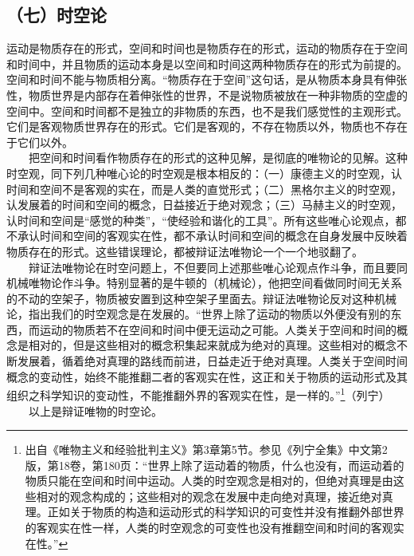 \documentclass[cn,11pt,chinese]{elegantbook}
\def\myformat#1{\hfil\hfil #1}
\begin{document}
\subsection*{\myformat{（七）时空论}}
运动是物质存在的形式，空间和时间也是物质存在的形式，运动的物质存在于空间和时间中，并且物质的运动本身是以空间和时间这两种物质存在的形式为前提的。空间和时间不能与物质相分离。“物质存在于空间”这句话，是从物质本身具有伸张性，物质世界是内部存在着伸张性的世界，不是说物质被放在一种非物质的空虚的空间中。空间和时间都不是独立的非物质的东西，也不是我们感觉性的主观形式。它们是客观物质世界存在的形式。它们是客观的，不存在物质以外，物质也不存在于它们以外。\\
　　把空间和时间看作物质存在的形式的这种见解，是彻底的唯物论的见解。这种时空观，同下列几种唯心论的时空观是根本相反的：（一）康德主义的时空观，认时间和空间不是客观的实在，而是人类的直觉形式；（二）黑格尔主义的时空观，认发展着的时间和空间的概念，日益接近于绝对观念；（三）马赫主义的时空观，认时间和空间是“感觉的种类”，“使经验和谐化的工具”。所有这些唯心论观点，都不承认时间和空间的客观实在性，都不承认时间和空间的概念在自身发展中反映着物质存在的形式。这些错误理论，都被辩证法唯物论一个一个地驳翻了。\\
　　辩证法唯物论在时空问题上，不但要同上述那些唯心论观点作斗争，而且要同机械唯物论作斗争。特别显著的是牛顿的（机械论），他把空间看做同时间无关系的不动的空架子，物质被安置到这种空架子里面去。辩证法唯物论反对这种机械论，指出我们的时空观念是在发展的。“世界上除了运动的物质以外便没有别的东西，而运动的物质若不在空间和时间中便无运动之可能。人类关于空间和时间的概念是相对的，但是这些相对的概念积集起来就成为绝对的真理。这些相对的概念不断发展着，循着绝对真理的路线而前进，日益走近于绝对真理。人类关于空间时间概念的变动性，始终不能推翻二者的客观实在性，这正和关于物质的运动形式及其组织之科学知识的变动性，不能推翻外界的客观实在性，是一样的。”\footnote[15]{ 出自《唯物主义和经验批判主义》第3章第5节。参见《列宁全集》中文第2版，第18卷，第180页：“世界上除了运动着的物质，什么也没有，而运动着的物质只能在空间和时间中运动。人类的时空观念是相对的，但绝对真理是由这些相对的观念构成的；这些相对的观念在发展中走向绝对真理，接近绝对真理。正如关于物质的构造和运动形式的科学知识的可变性并没有推翻外部世界的客观实在性一样，人类的时空观念的可变性也没有推翻空间和时间的客观实在性。”}（列宁）\\
　　以上是辩证唯物的时空论。\\
\end{document}
